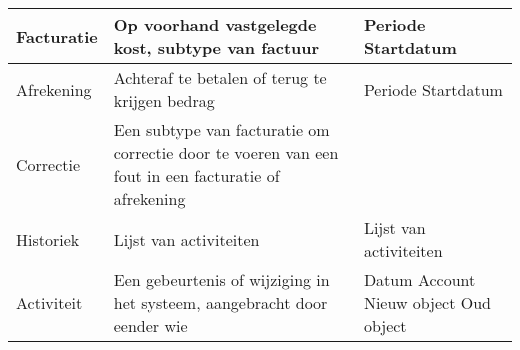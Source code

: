 \documentclass{article}
\begin{document}
\begin{tabularx}{\textwidth}{ | l | X |X|}
 Facturatie & 

 Op voorhand vastgelegde kost, subtype van factuur &
 
 Periode\newline
 Startdatum\\
 \hline
 
 Afrekening & 

 Achteraf te betalen of terug te krijgen bedrag &
 
 Periode\newline
 Startdatum\\
 \hline
 
 Correctie & 

 Een subtype van facturatie om correctie door te voeren van een fout in een facturatie of afrekening &
 
 \\
 \hline
 
 Historiek & 

 Lijst van activiteiten &
 
 Lijst van activiteiten\\
 \hline
 
 Activiteit & 

 Een gebeurtenis of wijziging in het systeem, aangebracht door eender wie &
 
 Datum\newline
 Account\newline
 Nieuw object\newline
 Oud object\\
 \hline


\end{tabularx}



\end{document}

